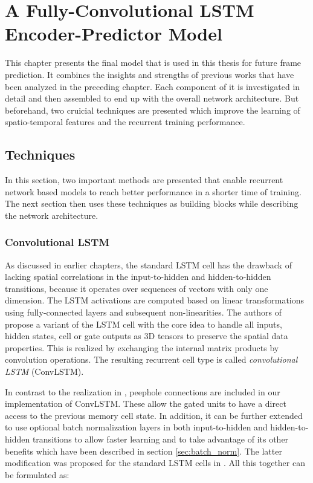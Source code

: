 
\chapter{A Fully-Convolutional LSTM Encoder-Predictor Model} \label{chapter:implementation}

This chapter presents the final model that is used in this thesis for future frame prediction. It combines the insights and strengths of previous works that have been analyzed in the preceding chapter. Each component of it is investigated in detail and then assembled to end up with the overall network architecture. But beforehand, two cruicial techniques are presented which improve the learning of spatio-temporal features and the recurrent training performance.

\section{Techniques}

In this section, two important methods are presented that enable recurrent network based models to reach better performance in a shorter time of training. The next section then uses these techniques as building blocks while describing the network architecture.

\subsection{Convolutional LSTM} \label{sec:conv_lstm}

As discussed in earlier chapters, the standard LSTM cell has the drawback of lacking spatial correlations in the input-to-hidden and hidden-to-hidden transitions, because it operates over sequences of vectors with only one dimension. The LSTM activations are computed based on linear transformations using fully-connected layers and subsequent non-linearities. The authors of \parencite{conv_lstm_nowcasting} propose a variant of the LSTM cell with the core idea to handle all inputs, hidden states, cell or gate outputs as 3D tensors to preserve the spatial data properties. This is realized by exchanging the internal matrix products by convolution operations. The resulting recurrent cell type is called \textit{convolutional LSTM} (ConvLSTM).

In contrast to the realization in \parencite{spat_temp_video_autoenc}, peephole connections are included in our implementation of ConvLSTM. These allow the gated units to have a direct access to the previous memory cell state. In addition, it can be further extended to use optional batch normalization layers in both input-to-hidden and hidden-to-hidden transitions to allow faster learning and to take advantage of its other benefits which have been described in section \ref{sec:batch_norm}. The latter modification was proposed for the standard LSTM cells in \parencite{rnn-batchnorm}. All this together can be formulated as:

